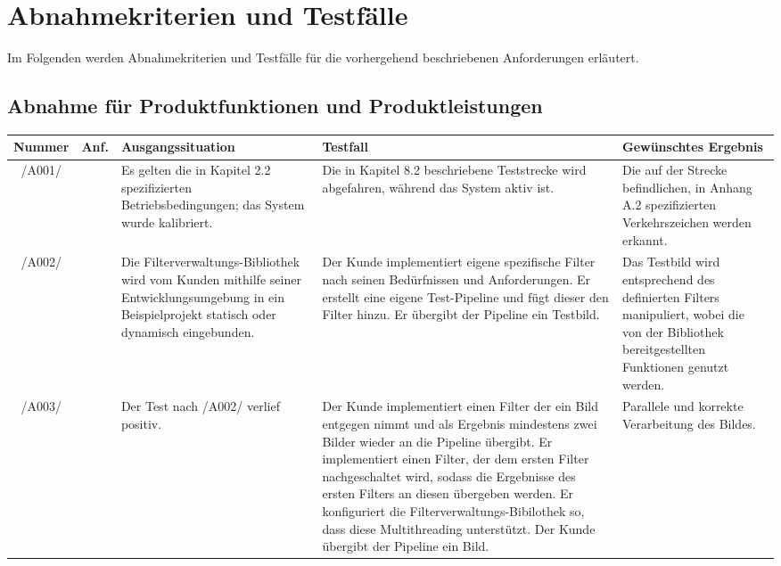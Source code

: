 \documentclass[12pt,a4paper,ngerman,enabledeprecatedfontcommands,landscape]{scrreprt}
\begin{document}
\setcounter{chapter}{7}%
\setcounter{page}{14}
\chapter{Abnahmekriterien und Testfälle}
Im Folgenden werden Abnahmekriterien und Testfälle für die vorhergehend beschriebenen Anforderungen erläutert.\\
\section{Abnahme für Produktfunktionen und Produktleistungen}
\label{subsec:abnahmeprodfunktionenuleistungen}
\begin{longtabu}{|c|X[0.25cm,p,c]|X[0.75cm,p,j]|X[j]|X[0.6cm,p,j]|}
\hline
\bfseries Nummer & \bfseries Anf. & \bfseries Ausgangssituation & \bfseries Testfall & \bfseries Gewünschtes Ergebnis\\
\hline
/A001/ & 
& Es gelten die in Kapitel 2.2 spezifizierten Betriebsbedingungen; das System wurde kalibriert. & Die in Kapitel 8.2 beschriebene Teststrecke wird abgefahren, während das System aktiv ist. &
Die auf der Strecke befindlichen, in Anhang A.2 spezifizierten Verkehrszeichen werden erkannt.\\
\hline
/A002/ & 
& Die Filterverwaltungs-Bibliothek wird vom Kunden mithilfe seiner Entwicklungsumgebung in ein Beispielprojekt statisch oder dynamisch eingebunden. & Der Kunde implementiert eigene spezifische Filter nach seinen Bedürfnissen und Anforderungen. Er erstellt eine eigene Test-Pipeline und fügt dieser den Filter hinzu. Er übergibt der Pipeline ein Testbild. & Das Testbild wird entsprechend des definierten Filters manipuliert, wobei die von der Bibliothek bereitgestellten Funktionen genutzt werden. \\
\hline
/A003/ &  & Der Test nach /A002/ verlief positiv. & Der Kunde implementiert einen Filter der ein Bild entgegen nimmt und als Ergebnis mindestens zwei Bilder wieder an die Pipeline übergibt. Er implementiert einen Filter, der dem ersten Filter nachgeschaltet wird, sodass die Ergebnisse des ersten Filters an diesen übergeben werden. Er konfiguriert die Filterverwaltungs-Bibilothek so, dass diese Multithreading unterstützt. Der Kunde übergibt der Pipeline ein Bild. & Parallele und korrekte Verarbeitung des Bildes.\\

\end{longtabu}
\end{document}
